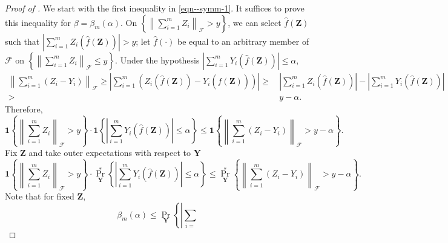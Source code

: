 \begin{proof}[Proof of ]
We start with the first inequality in \eqref{eqn--symm-1}.
It suffices to prove this inequality for \(\beta = \beta_{m} (\alpha)\).
On \(\left\{ \left\| \sum_{i = 1}^{m} Z_{i} \right\|_{\mathcal{F}} > y
\right\}\), we can select \(\widehat{f} (\mathbf{Z})\) such that \(\left|
\sum_{i = 1}^{m} Z_{i} \left( \widehat{f} (\mathbf{Z}) \right) \right| > y\);
let
\(\widehat{f} (\cdot)\) be equal to an arbitrary member of \(\mathcal{F}\) on
\(\left\{ \left\| \sum_{i = 1}^{m} Z_{i} \right\|_{\mathcal{F}} \leq y
\right\}\).
Under the hypothesis
\(\left| \sum_{i = 1}^{m} Y_{i} \left( \widehat{f} (\mathbf{Z}) \right) \right|
\leq \alpha\),
\begin{equation*}
  \begin{split}
  \left\| \sum_{i = 1}^{m} \left( Z_{i} - Y_{i} \right) \right\|_{\mathcal{F}}
  \geq
  \left| \sum_{i = 1}^{m} \left( Z_{i} \left( \widehat{f} (\mathbf{Z}) \right) -
  Y_{i} \left( \widehat{f} (\mathbf{Z}) \right) \right) \right| \geq
  & \, \left| \sum_{i = 1}^{m} Z_{i} \left( \widehat{f} (\mathbf{Z}) \right)
  \right| - \left| \sum_{i = 1}^{m} Y_{i} \left( \widehat{f} (\mathbf{Z})
  \right) \right| \\
  >
  & \,  y - \alpha.
  \end{split}
\end{equation*}
Therefore,
\begin{equation*}
  \mathbf{1} \left\{ \left\| \sum_{i = 1}^{m} Z_{i} \right\|_{\mathcal{F}} > y
  \right\} \cdot \mathbf{1} \left\{ \left| \sum_{i = 1}^{m} Y_{i} \left(
  \widehat{f} (\mathbf{Z}) \right) \right| \leq \alpha \right\} \leq
  \mathbf{1} \left\{ \left\| \sum_{i = 1}^{m} \left( Z_{i} - Y_{i} \right)
  \right\|_{\mathcal{F}} > y - \alpha \right\}.
\end{equation*}
Fix \(\mathbf{Z}\) and take outer expectations with respect to
\(\mathbf{Y}\)
\begin{equation}
  \mathbf{1} \left\{ \left\| \sum_{i = 1}^{m} Z_{i} \right\|_{\mathcal{F}} > y
  \right\} \cdot \Pr_{\mathbf{Y}}^{\ast} \left\{ \left| \sum_{i = 1}^{m} Y_{i}
  \left( \widehat{f} (\mathbf{Z}) \right) \right| \leq \alpha \right\} \leq
  \Pr_{\mathbf{Y}}^{\ast} \left\{ \left\| \sum_{i = 1}^{m} \left( Z_{i} - Y_{i}
  \right) \right\|_{\mathcal{F}} > y - \alpha \right\}.
  \label{eqn--symm-1-1}
\end{equation}
Note that for fixed \(\mathbf{Z}\),
\begin{equation*}
  \beta_{m} (\alpha) \leq \Pr_{\mathbf{Y}} \left\{ \left| \sum_{i =
}
\end{equation*}
\end{proof}
